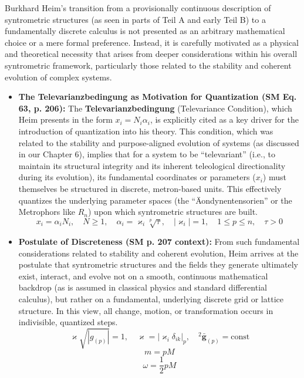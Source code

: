 \documentclass[12pt]{article}
\newcommand{\q}[1]{\enquote{#1}}
\newcommand{\semantischermetrophor}{R_n}
\begin{document}
Burkhard Heim's transition from a provisionally continuous description of syntrometric structures (as seen in parts of Teil A and early Teil B) to a fundamentally discrete calculus is not presented as an arbitrary mathematical choice or a mere formal preference. Instead, it is carefully motivated as a physical and theoretical necessity that arises from deeper considerations within his overall syntrometric framework, particularly those related to the stability and coherent evolution of complex systems.

\begin{itemize}
    \item \textbf{The Televarianzbedingung as Motivation for Quantization (SM Eq. 63, p. 206):}
    The \textbf{Televarianzbedingung} (Televariance Condition), which Heim presents in the form \( x_i = N_i \alpha_i \), is explicitly cited as a key driver for the introduction of quantization into his theory. This condition, which was related to the stability and purpose-aligned evolution of systems (as discussed in our Chapter 6), implies that for a system to be \q{televariant} (i.e., to maintain its structural integrity and its inherent teleological directionality during its evolution), its fundamental coordinates or parameters (\(x_i\)) must themselves be structured in discrete, metron-based units. This effectively quantizes the underlying parameter spaces (the \q{Äondynentensorien} or the Metrophors like \( \semantischermetrophor \)) upon which syntrometric structures are built.
    \begin{equation}
    x_i = \alpha_i N_i, \quad N \ge 1, \quad \alpha_i = \varkappa_i \sqrt[p]{\tau}, \quad |\varkappa_i| = 1, \quad 1 \le p \le n, \quad \tau > 0 \tag{63}
    \end{equation}

    \item \textbf{Postulate of Discreteness (SM p. 207 context):}
    From such fundamental considerations related to stability and coherent evolution, Heim arrives at the postulate that syntrometric structures and the fields they generate ultimately exist, interact, and evolve not on a smooth, continuous mathematical backdrop (as is assumed in classical physics and standard differential calculus), but rather on a fundamental, underlying discrete grid or lattice structure. In this view, all change, motion, or transformation occurs in indivisible, quantized steps.
    \begin{equation}
    \varkappa \sqrt{|g_{(p)}|} = 1, \quad \varkappa = |\varkappa_i \delta_{ik}|_p, \quad {}^2\bar{\mathbf{g}}_{(p)} = \text{const} \tag{64}
    \end{equation}
    \begin{equation}
    m = p M \tag{65}
    \end{equation}
    \begin{equation}
    \omega = \frac{1}{2} p M \tag{65a}
    \end{equation}


\end{itemize}
\end{document}

